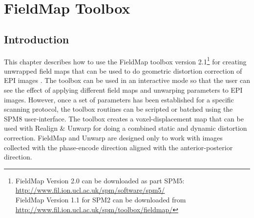\chapter{FieldMap Toolbox \label{Chap:FieldMap}}

\section{Introduction}

This chapter describes how to use the FieldMap toolbox version 2.1\footnote{
FieldMap Version 2.0 can be downloaded as part SPM5:
\url{http://www.fil.ion.ucl.ac.uk/spm/software/spm5/}\\
FieldMap Version 1.1 for SPM2 can be downloaded from
\url{http://www.fil.ion.ucl.ac.uk/spm/toolbox/fieldmap/}}
 for creating unwrapped field maps that can be used to do geometric distortion correction of EPI images \cite{jezzard95,jenkinson03,chloe_distortion,chloe_distortion2,ja_geometric}. The toolbox can be used in an interactive mode so that the user can see the effect of applying different field maps and unwarping parameters to EPI images. However, once a set of parameters has been established for a specific scanning protocol, the toolbox routines can be scripted or batched using the SPM8 user-interface. The toolbox creates a voxel-displacement map that can be used with Realign \& Unwarp for doing a combined static and dynamic distortion correction. FieldMap and Unwarp are designed only to work with images collected with the phase-encode direction aligned with the anterior-posterior direction.

